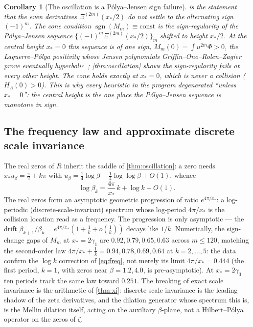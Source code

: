 \documentclass[11pt,reqno]{amsart}
\theoremstyle{plain}
\newtheorem{corollary}[theorem]{Corollary}
\theoremstyle{definition}
\theoremstyle{remark}
\DeclareMathOperator{\sgn}{sgn}
\begin{document}
\begin{corollary}[The oscillation is a P\'olya--Jensen sign failure]
\label{cor:jensen}
 is the statement that the even derivatives
$\Xi^{(2m)}(x_*/2)$ do not settle to the alternating sign $(-1)^m$. The cone
condition $\sgn(M_m)\equiv\text{const}$ is the sign-regularity of the
P\'olya--Jensen sequence $\bigl\{(-1)^m\Xi^{(2m)}(x_*/2)\bigr\}_m$ shifted to
height $x_*/2$. At the central height $x_*=0$ this sequence is of one sign,
$M_m(0)=\int u^{2m}\Phi>0$, the Laguerre--P\'olya positivity whose Jensen
polynomials Griffin--Ono--Rolen--Zagier prove eventually
hyperbolic~\cite{GORZ}; \cref{thm:oscillation} shows the sign-regularity
fails at every other height. The cone holds exactly at $x_*=0$, which is
never a collision ($H_\Lambda(0)>0$). This is why every heuristic in the
program degenerated ``unless $x_*=0$'': the central height is the one place
the P\'olya--Jensen sequence is monotone in sign.
\end{corollary}

\subsection{The frequency law and approximate discrete scale invariance}
The real zeros of $R$ inherit the saddle of \cref{thm:oscillation}: a zero
needs $x_*u_\beta=\tfrac\pi2+k\pi$ with $u_\beta=\tfrac14\log\beta-\tfrac14
\log\log\beta+O(1)$, whence
\begin{equation}\label{eq:freq}
  \log\beta_k=\frac{4\pi}{x_*}\,k+\log k+O(1).
\end{equation}
The real zeros form an asymptotic geometric progression of ratio
$e^{4\pi/x_*}$: a log-periodic (discrete-scale-invariant) spectrum whose
log-period $4\pi/x_*$ is the collision location read as a frequency. The
progression is only asymptotic --- the drift $\beta_{k+1}/\beta_k=
e^{4\pi/x_*}(1+\tfrac1k+o(\tfrac1k))$ decays like $1/k$. Numerically, the
sign-change gaps of $M_m$ at $x_*=2\gamma_1$ are $0.92,0.79,0.65,0.63$ across
$m\le120$, matching the second-order law $4\pi/x_*+\tfrac1k=0.94,0.78,0.69,
0.64$ at $k=2,\dots,5$: the data confirm the $\log k$ correction of
\eqref{eq:freq}, not merely its limit $4\pi/x_*=0.444$ (the first period,
$k=1$, with zeros near $\beta=1.2,4.0$, is pre-asymptotic). At $x_*=2\gamma_3$
ten periods track the same law toward $0.251$. The
breaking of exact scale invariance is the arithmetic of \cref{thm:xi}:
discrete scale invariance is the leading shadow of the zeta derivatives, and
the dilation generator whose spectrum this is, is the Mellin dilation
itself, acting on the auxiliary $\beta$-plane, not a Hilbert--P\'olya
operator on the zeros of $\zeta$.
\end{document}

